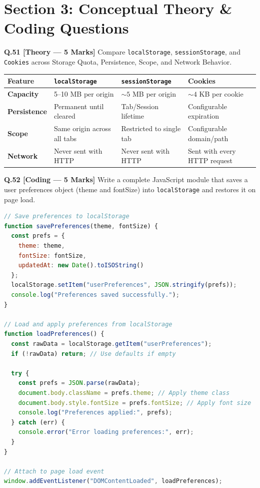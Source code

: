 \section{Section 3: Conceptual Theory \& Coding Questions}
\noindent\textbf{Q.51 [Theory --- 5 Marks]} Compare \texttt{localStorage}, \texttt{sessionStorage}, and \texttt{Cookies} across Storage Quota, Persistence, Scope, and Network Behavior.

\begin{qbsolutionbox}[Answer to Q.51]
\begin{center}
\begin{tabularx}{\textwidth}{l X X X}
\toprule
\textbf{Feature} & \textbf{\texttt{localStorage}} & \textbf{\texttt{sessionStorage}} & \textbf{Cookies} \\
\midrule
\textbf{Capacity} & 5--10 MB per origin & $\sim 5$ MB per origin & $\sim 4$ KB per cookie \\
\textbf{Persistence} & Permanent until cleared & Tab/Session lifetime & Configurable expiration \\
\textbf{Scope} & Same origin across all tabs & Restricted to single tab & Configurable domain/path \\
\textbf{Network} & Never sent with HTTP & Never sent with HTTP & Sent with every HTTP request \\
\bottomrule
\end{tabularx}
\end{center}
\end{qbsolutionbox}

\noindent\textbf{Q.52 [Coding --- 5 Marks]} Write a complete JavaScript module that saves a user preferences object (theme and fontSize) into \texttt{localStorage} and restores it on page load.

\begin{qbsolutionbox}[Answer to Q.52]
\begin{lstlisting}[language=JavaScript]
// Save preferences to localStorage
function savePreferences(theme, fontSize) {
  const prefs = {
    theme: theme,
    fontSize: fontSize,
    updatedAt: new Date().toISOString()
  };
  localStorage.setItem("userPreferences", JSON.stringify(prefs));
  console.log("Preferences saved successfully.");
}

// Load and apply preferences from localStorage
function loadPreferences() {
  const rawData = localStorage.getItem("userPreferences");
  if (!rawData) return; // Use defaults if empty

  try {
    const prefs = JSON.parse(rawData);
    document.body.className = prefs.theme; // Apply theme class
    document.body.style.fontSize = prefs.fontSize; // Apply font size
    console.log("Preferences applied:", prefs);
  } catch (err) {
    console.error("Error loading preferences:", err);
  }
}

// Attach to page load event
window.addEventListener("DOMContentLoaded", loadPreferences);
\end{lstlisting}
\end{qbsolutionbox}

